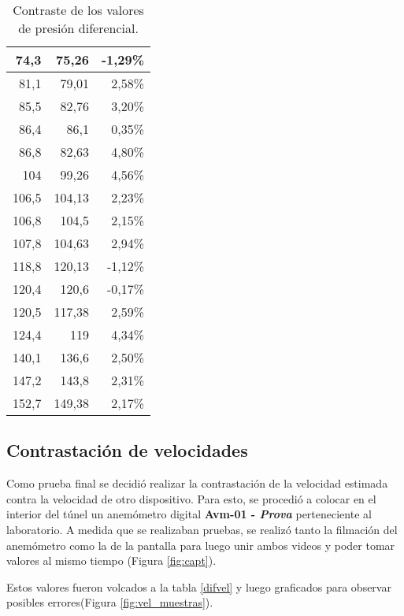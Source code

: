 \begin{table}[H]
\begin{tabular}{|r|r|r}
			74,3 & 75,26 & \multicolumn{1}{r|}{-1,29\%} \\ \hline
			81,1 & 79,01 & \multicolumn{1}{r|}{2,58\%} \\ \hline
			85,5 & 82,76 & \multicolumn{1}{r|}{3,20\%} \\ \hline
			86,4 & 86,1 & \multicolumn{1}{r|}{0,35\%} \\ \hline
			86,8 & 82,63 & \multicolumn{1}{r|}{4,80\%} \\ \hline
			104 & 99,26 & \multicolumn{1}{r|}{4,56\%} \\ \hline
			106,5 & 104,13 & \multicolumn{1}{r|}{2,23\%} \\ \hline
			106,8 & 104,5 & \multicolumn{1}{r|}{2,15\%} \\ \hline
			107,8 & 104,63 & \multicolumn{1}{r|}{2,94\%} \\ \hline
			118,8 & 120,13 & \multicolumn{1}{r|}{-1,12\%} \\ \hline
			120,4 & 120,6 & \multicolumn{1}{r|}{-0,17\%} \\ \hline
			120,5 & 117,38 & \multicolumn{1}{r|}{2,59\%} \\ \hline
			124,4 & 119 & \multicolumn{1}{r|}{4,34\%} \\ \hline
			140,1 & 136,6 & \multicolumn{1}{r|}{2,50\%} \\ \hline
			147,2 & 143,8 & \multicolumn{1}{r|}{2,31\%} \\ \hline
			152,7 & 149,38 & \multicolumn{1}{r|}{2,17\%} \\ \hline
		\end{tabular}
	\caption{Contraste de los valores de presión diferencial.}
	\label{difpres}

\end{table}

\subsection{Contrastación de velocidades}
Como prueba final se decidió realizar la contrastación de la velocidad estimada contra la velocidad de otro dispositivo. Para esto, se procedió a colocar en el interior del túnel un anemómetro digital \textbf{Avm-01 -\textit{ Prova}} perteneciente al laboratorio. A medida que se realizaban pruebas, se realizó tanto la filmación del anemómetro como la de la pantalla para luego unir ambos videos y poder tomar valores al mismo tiempo (Figura \ref{fig:capt}).

Estos valores fueron volcados a la tabla \ref{difvel} y luego graficados para observar posibles errores(Figura \ref{fig:vel_muestras}).


